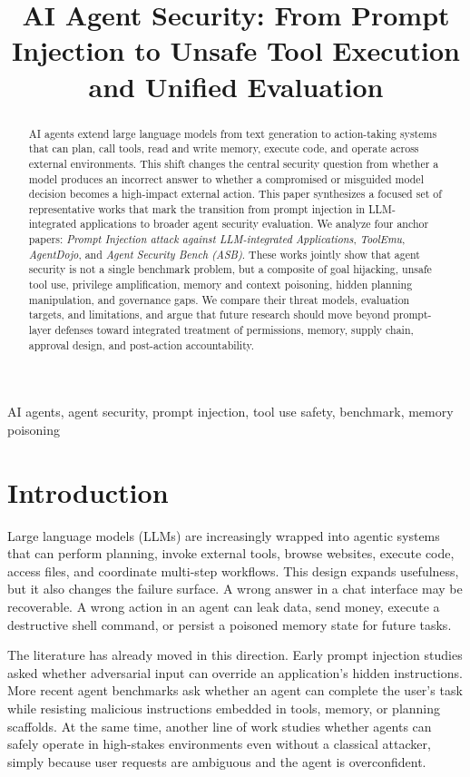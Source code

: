 \documentclass[conference]{IEEEtran}
\title{AI Agent Security: From Prompt Injection to Unsafe Tool Execution and Unified Evaluation}
\author{
\IEEEauthorblockN{Anonymous Author(s)}
\IEEEauthorblockA{Draft prepared in the academic-workspace research workflow}
}
\begin{document}
\maketitle

\begin{abstract}
AI agents extend large language models from text generation to action-taking systems that can plan, call tools, read and write memory, execute code, and operate across external environments. This shift changes the central security question from whether a model produces an incorrect answer to whether a compromised or misguided model decision becomes a high-impact external action. This paper synthesizes a focused set of representative works that mark the transition from prompt injection in LLM-integrated applications to broader agent security evaluation. We analyze four anchor papers: \emph{Prompt Injection attack against LLM-integrated Applications}, \emph{ToolEmu}, \emph{AgentDojo}, and \emph{Agent Security Bench (ASB)}. These works jointly show that agent security is not a single benchmark problem, but a composite of goal hijacking, unsafe tool use, privilege amplification, memory and context poisoning, hidden planning manipulation, and governance gaps. We compare their threat models, evaluation targets, and limitations, and argue that future research should move beyond prompt-layer defenses toward integrated treatment of permissions, memory, supply chain, approval design, and post-action accountability.
\end{abstract}

\begin{IEEEkeywords}
AI agents, agent security, prompt injection, tool use safety, benchmark, memory poisoning
\end{IEEEkeywords}

\section{Introduction}

Large language models (LLMs) are increasingly wrapped into agentic systems that can perform planning, invoke external tools, browse websites, execute code, access files, and coordinate multi-step workflows. This design expands usefulness, but it also changes the failure surface. A wrong answer in a chat interface may be recoverable. A wrong action in an agent can leak data, send money, execute a destructive shell command, or persist a poisoned memory state for future tasks.

The literature has already moved in this direction. Early prompt injection studies asked whether adversarial input can override an application's hidden instructions. More recent agent benchmarks ask whether an agent can complete the user's task while resisting malicious instructions embedded in tools, memory, or planning scaffolds. At the same time, another line of work studies whether agents can safely operate in high-stakes environments even without a classical attacker, simply because user requests are ambiguous and the agent is overconfident.
\end{document}
